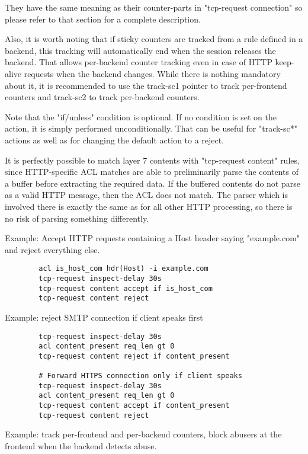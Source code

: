   They have the same meaning as their counter-parts in "tcp-request connection"
  so please refer to that section for a complete description.

  Also, it is worth noting that if sticky counters are tracked from a rule
  defined in a backend, this tracking will automatically end when the session
  releases the backend. That allows per-backend counter tracking even in case
  of HTTP keep-alive requests when the backend changes. While there is nothing
  mandatory about it, it is recommended to use the track-sc1 pointer to track
  per-frontend counters and track-sc2 to track per-backend counters.

  Note that the "if/unless" condition is optional. If no condition is set on
  the action, it is simply performed unconditionally. That can be useful for
  "track-sc*" actions as well as for changing the default action to a reject.

  It is perfectly possible to match layer 7 contents with "tcp-request content"
  rules, since HTTP-specific ACL matches are able to preliminarily parse the
  contents of a buffer before extracting the required data. If the buffered
  contents do not parse as a valid HTTP message, then the ACL does not match.
  The parser which is involved there is exactly the same as for all other HTTP
  processing, so there is no risk of parsing something differently.

  Example: Accept HTTP requests containing a Host header saying "example.com" and reject everything else.
  \begin{verbatim}
        acl is_host_com hdr(Host) -i example.com
        tcp-request inspect-delay 30s
        tcp-request content accept if is_host_com
        tcp-request content reject
  \end{verbatim}

  Example: reject SMTP connection if client speaks first
  \begin{verbatim}
        tcp-request inspect-delay 30s
        acl content_present req_len gt 0
        tcp-request content reject if content_present

        # Forward HTTPS connection only if client speaks
        tcp-request inspect-delay 30s
        acl content_present req_len gt 0
        tcp-request content accept if content_present
        tcp-request content reject
  \end{verbatim}

  Example: track per-frontend and per-backend counters, block abusers at the
           frontend when the backend detects abuse.

